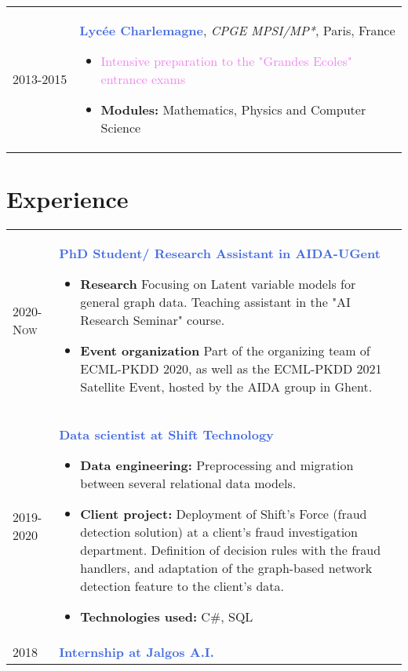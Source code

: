 \documentclass[a4paper,10pt]{article} %
\begin{document}
{\begin{tabular}{p{2cm}p{15cm}}
	\textsc{2013}-2015  & \textcolor{royalblue}{\textbf{Lyc\'{e}e Charlemagne}}, \emph{CPGE MPSI/MP*}, Paris, France
	\begin{itemize}
		\item \textcolor{violet}{Intensive preparation to the "Grandes Ecoles" entrance exams}
		\item \textcolor{pinegreen}{\textbf{Modules:}} Mathematics, Physics and Computer Science
	\end{itemize}
\end{tabular}


\section{Experience}

\begin{tabular}{p{2cm}p{15cm}}

	\textsc{2020-Now} & \textcolor{royalblue}{\textbf{PhD Student/ Research Assistant in AIDA-UGent}}
	\begin{itemize}
		\item \textcolor{pinegreen}{\textbf{Research}} Focusing on Latent variable models for general graph data. Teaching assistant in the "AI Research Seminar" course.
		\item \textcolor{pinegreen}{\textbf{Event organization}} Part of the organizing team of ECML-PKDD 2020, as well as the ECML-PKDD 2021 Satellite Event, hosted by the AIDA group in Ghent.
	\end{itemize}  \\
	\textsc{2019-2020} & \textcolor{royalblue}{\textbf{Data scientist at Shift Technology}}
	\begin{itemize}
		\item \textcolor{pinegreen}{\textbf{Data engineering:}} Preprocessing and migration between several relational data models.
		\item \textcolor{pinegreen}{\textbf{Client project:}} Deployment of Shift's Force (fraud detection solution) at a client's fraud investigation department. Definition of decision rules with the fraud handlers, and adaptation of the graph-based network detection feature to the client's data.
		\item \textcolor{pinegreen}{\textbf{Technologies used:}} C\#, SQL
	\end{itemize}                                                               \\
	\textsc{2018}      & \textcolor{royalblue}{\textbf{Internship at Jalgos A.I.}}


\end{tabular}}
\end{document}
